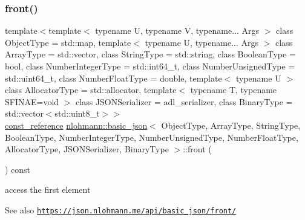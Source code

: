 \subsubsection{\texorpdfstring{front()}{front()}\hspace{0.1cm}{\footnotesize\ttfamily [2/2]}}
{\footnotesize\ttfamily template$<$template$<$ typename U, typename V, typename... Args $>$ class Object\+Type = std\+::map, template$<$ typename U, typename... Args $>$ class Array\+Type = std\+::vector, class String\+Type  = std\+::string, class Boolean\+Type  = bool, class Number\+Integer\+Type  = std\+::int64\+\_\+t, class Number\+Unsigned\+Type  = std\+::uint64\+\_\+t, class Number\+Float\+Type  = double, template$<$ typename U $>$ class Allocator\+Type = std\+::allocator, template$<$ typename T, typename S\+F\+I\+N\+A\+E=void $>$ class J\+S\+O\+N\+Serializer = adl\+\_\+serializer, class Binary\+Type  = std\+::vector$<$std\+::uint8\+\_\+t$>$$>$ \\
\hyperlink{classnlohmann_1_1basic__json_ab8a1c33ee7b154fc41ca2545aa9724e6}{const\+\_\+reference} \hyperlink{classnlohmann_1_1basic__json}{nlohmann\+::basic\+\_\+json}$<$ Object\+Type, Array\+Type, String\+Type, Boolean\+Type, Number\+Integer\+Type, Number\+Unsigned\+Type, Number\+Float\+Type, Allocator\+Type, J\+S\+O\+N\+Serializer, Binary\+Type $>$\+::front (\begin{DoxyParamCaption}{ }\end{DoxyParamCaption}) const\hspace{0.3cm}{\ttfamily [inline]}}



access the first element 

\begin{DoxySeeAlso}{See also}
\href{https://json.nlohmann.me/api/basic_json/front/}{\tt https\+://json.\+nlohmann.\+me/api/basic\+\_\+json/front/} 
\end{DoxySeeAlso}
\mbox{\label{classnlohmann_1_1basic__json_ad8c8d2d107c6952960ba8aa78e009284}} 
